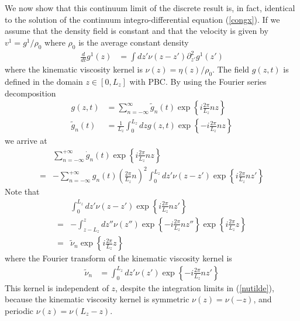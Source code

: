 \documentclass[a4paper,openright,12pt]{book}
\begin{document}
{We now  show that this continuum  limit of the discrete  result is, in
fact, identical to the  solution of the continuum integro-differential
equation  (\ref{congx}).   If we  assume  that  the density  field  is
constant  and that  the velocity  is given  by $v^1=g^1/\rho_0$  where
$\rho_0$ is the average constant density
\begin{align}
  \frac{d}{dt} g^1(z)&=\int dz'{\nu}(z-z')\partial^2_{z'} g^1(z')
\label{pgz}
\end{align}
where the kinematic viscosity  kernel is $\nu(z)=\eta(z)/\rho_0$.  The
field $g(z,t)$  is defined  in the domain  $z\in[0,L_z]$ with  PBC. By
using the Fourier series decomposition
\begin{align}
  g(z,t)&=\sum_{n=-\infty}^{\infty} \tilde{g}_n(t) \exp\left\{i\frac{2\pi}{L_z}nz\right\}
\nonumber\\
\tilde{g}_n(t)&=\frac{1}{L_z}\int_0^{L_z}dzg(z,t)  \exp\left\{-i\frac{2\pi}{L_z}nz\right\}
\end{align}
 we arrive at
\begin{align}
&  \sum_{n=-\infty}^{+\infty}\dot{g}_n(t)\exp\left\{i\frac{2\pi}{L_z}nz\right\}
\nonumber\\=&-  \sum_{n=-\infty}^{+\infty}{g}_n(t)\left(\frac{2\pi}{L_z}n\right)^2
\int_0^{L_z}dz'\nu(z-z')\exp\left\{i\frac{2\pi}{L_z}nz'\right\}
\label{Fou1}
\end{align}
Note that
\begin{align}
&  \int_0^{L_z}dz'\nu(z-z')\exp\left\{i\frac{2\pi}{L_z}nz'\right\}
\nonumber\\
=&
-\int_{z-L_z}^z dz''\nu(z'')\exp\left\{-i\frac{2\pi}{L_z}nz''\right\} \exp\left\{i\frac{2\pi}{L_z}z\right\}
\nonumber\\
=&\tilde{\nu}_n\exp\left\{i\frac{2\pi}{L_z}z\right\}
\label{nutilde}
\end{align}
where the Fourier transform of the kinematic viscosity kernel is
\begin{align}
  \tilde{\nu}_n&=\int_{0}^{L_z} dz'\nu(z')\exp\left\{-i\frac{2\pi}{L_z}nz'\right\} 
\end{align}
This kernel is   independent   of  $z$,   despite   the   integration  limits   in
(\ref{nutilde}), because  the kinematic viscosity kernel  is symmetric
$\nu(z)=\nu(-z)$, and periodic $\nu(z)=\nu(L_z-z)$.

}
\end{document}
